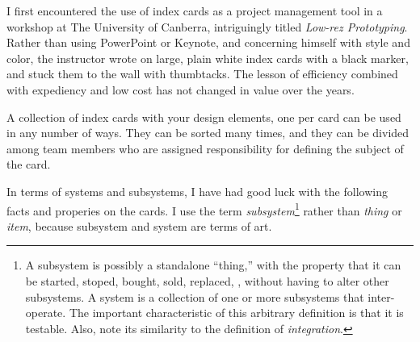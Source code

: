 \documentclass[11pt,letterpaper,twosided]{memoir}
\begin{document}
I first encountered the use of index cards as a project management
tool in a workshop at The University of Canberra, intriguingly
titled \emph{Low-rez Prototyping}.  Rather than using PowerPoint
or Keynote, and concerning himself with style and color, the
instructor wrote on large, plain white index cards with a black
marker, and stuck them to the wall with thumbtacks. The lesson of
efficiency combined with expediency and low cost has not changed
in value over the years.

A collection of index cards with your design elements, one per card
can be used in any number of ways. They can be sorted many times,
and they can be divided among team members who are assigned
responsibility for defining the subject of the card.

In terms of systems and subsystems, I have had good luck with the
following facts and properies on the cards. I use the term
\emph{subsystem}\footnote{A subsystem is possibly a standalone
``thing,'' with the property that it can be started, stoped, bought,
sold, replaced, \etc, without having to alter other subsystems. A
system is a collection of one or more subsystems that inter-operate.
The important characteristic of this arbitrary definition is that
it is testable. Also, note its similarity to the definition of 
\emph{integration}.} rather than \emph{thing} or \emph{item}, because
subsystem and system are terms of art.
\end{document}
